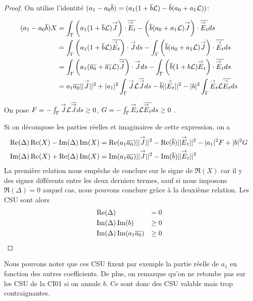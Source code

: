       \begin{proof}
        On utilise l'identité \((a_1-a_0\conj{b}) = (a_1(1+\conj{b}\LL) - \conj{b}(a_0+a_1\LL))\):

        \begin{align*}
          (a_1-a_0\conj{b})X &= \int_\Gamma \left(a_1(1+\conj{b}\LL) \vJ\right)\cdot\conj{\vE_t} - \left(\conj{b}(a_0+a_1 \LL)\vJ\right)\cdot\conj{\vE_t} ds\\
          &= \int_\Gamma \left(a_1(1+\conj{b}\LL) \conj{\vE_t}\right)\cdot\vJ ds - \int_\Gamma \left(\conj{b}(a_0+a_1 \LL)\vJ\right)\cdot\conj{\vE_t} ds\\
          &= \int_\Gamma \left(a_1(\conj{a_0}+\conj{a_1}\LL) \conj{\vJ}\right)\cdot\vJ ds  - \int_\Gamma \left(\conj{b}(1+b \LL)\vE_t\right)\cdot\conj{\vE_t} ds\\
          &= a_1\conj{a_0} ||\vJ||^2 + |a_1|^2 \int_\Gamma \vJ \LL \conj{\vJ} ds - \conj{b} ||\vE_t||^2 - |b|^2 \int_\Gamma \vE_t \LL \conj{\vE_t} ds
        \end{align*}

        On pose \(F = -\int_\Gamma \vJ \LL \conj{\vJ} ds \ge 0 \), \(G = -\int_\Gamma \vE_t \LL \conj{\vE_t} ds \ge 0 \) .

        Si on décompose les parties réelles et imaginaires de cette expression, on a
        \begin{align*}
          \Re(\Delta)\Re(X) - \Im(\Delta)\Im(X) &= \Re(a_1\conj{a_0}) ||\vJ||^2 - \Re(\conj{b})||\vE_t||^2 -|a_1|^2 F + |b|^2 G \\
          \Im(\Delta)\Re(X) + \Re(\Delta)\Im(X) &= \Im(a_1\conj{a_0}) ||\vJ||^2 - \Im(\conj{b})||\vE_t||^2
        \end{align*}
        La première relation nous empêche de conclure sur le signe de \(\Re(X)\) car il y des signes différents entre les deux derniers termes, sauf si nous imposons \(\Re(\Delta)= 0\) auquel cas, nous pouvons conclure grâce à la deuxième relation. Les CSU sont alors
        \begin{align}
          &\Re(\Delta) &= 0\\
          &\Im(\Delta)\Im(b) &\ge 0\\
          &\Im(\Delta)\Im(a_1\conj{a_0})&\ge 0
        \end{align}
      \end{proof}
      Nous pouvons noter que ces CSU fixent par exemple la partie réelle de \(a_1\) en fonction des autres coefficients. De plus, on remarque qu'on ne retombe pas sur les CSU de la CI01 si on annule \(b\). Ce sont donc des CSU valable mais trop contraignantes.
